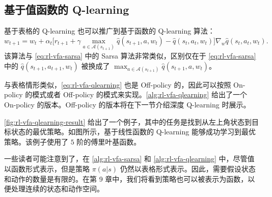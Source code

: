 \subsection{基于值函数的 Q-learning}
\label{sec:rl-vfa-qlearning}

基于表格的 Q-learning 也可以推广到基于函数的 Q-learning 算法：
\begin{equation}
w_{t+1} = w_{t} + \alpha_{t} \Big[r_{t+1} + \gamma \max_{a \in \mathcal{A}(s_{t+1})} \hat{q}(s_{t+1}, a, w_{t}) - \hat{q}(s_{t}, a_{t}, w_{t})\Big] \nabla_{w} \hat{q}(s_{t}, a_{t}, w_{t}).
\label{eq:rl-vfa-qlearning}
\end{equation}
该算法与 \cref{eq:rl-vfa-sarsa} 中的 Sarsa 算法非常类似，区别仅在于 \cref{eq:rl-vfa-sarsa} 中的 $\hat{q}(s_{t+1},a_{t+1},w_t)$ 被换成了 $\max_{a\in \mathcal{A}(s_{t+1})}\hat{q}(s_{t+1},a,w_t)$。

与表格情形类似，\cref{eq:rl-vfa-qlearning} 也是 Off-policy 的，因此可以按照 On-policy 的模式或者 Off-policy 的模式来实现。\cref{alg:rl-vfa-qlearning} 给出了一个 On-policy 的版本。Off-policy 的版本将在下一节介绍深度 Q-learning 时展示。

\cref{fig:rl-vfa-qlearning-result} 给出了一个例子，其中的任务是找到从左上角状态到目标状态的最优策略。如图所示，基于线性函数的 Q-learning 能够成功学习到最优策略。该例子使用了 $5$ 阶的傅里叶基函数。

一些读者可能注意到了，在 \cref{alg:rl-vfa-sarsa} 和 \cref{alg:rl-vfa-qlearning} 中，尽管值以函数形式表示，但是策略 $\pi(a|s)$ 仍然以表格形式表示。因此，需要假设状态和动作的数量是有限的。在第 9 章中，我们将看到策略也可以被表示为函数，以便处理连续的状态和动作空间。

